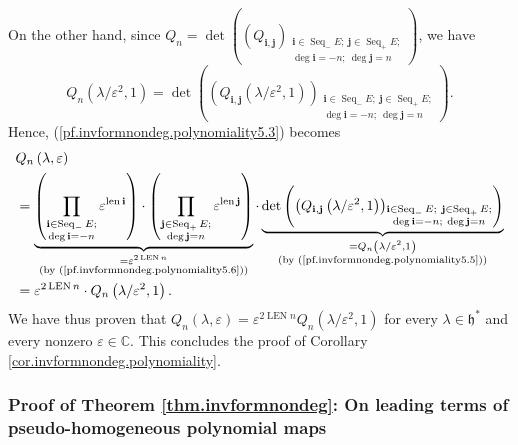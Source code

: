 \documentclass[etingof-lie.tex]{subfiles}
\begin{document}
On the other hand, since $Q_{n}=\det\left(  \left(  Q_{\mathbf{i},\mathbf{j}%
}\right)  _{\substack{\mathbf{i}\in\operatorname*{Seq}\nolimits_{-}%
E;\ \mathbf{j}\in\operatorname*{Seq}\nolimits_{+}E;\\\deg\mathbf{i}%
=-n;\ \deg\mathbf{j}=n}}\right)  $, we have%
\begin{equation}
Q_{n}\left(  \lambda/\varepsilon^{2},1\right)  =\det\left(  \left(
Q_{\mathbf{i},\mathbf{j}}\left(  \lambda/\varepsilon^{2},1\right)  \right)
_{\substack{\mathbf{i}\in\operatorname*{Seq}\nolimits_{-}E;\ \mathbf{j}%
\in\operatorname*{Seq}\nolimits_{+}E;\\\deg\mathbf{i}=-n;\ \deg\mathbf{j}%
=n}}\right)  . \label{pf.invformnondeg.polynomiality5.5}%
\end{equation}
Hence, (\ref{pf.invformnondeg.polynomiality5.3}) becomes%
\begin{align*}
&  Q_{n}\left(  \lambda,\varepsilon\right) \\
&  =\underbrace{\left(  \prod\limits_{\substack{\mathbf{i}\in
\operatorname*{Seq}\nolimits_{-}E;\\\deg\mathbf{i}=-n}}\varepsilon
^{\operatorname*{len}\mathbf{i}}\right)  \cdot\left(  \prod
\limits_{\substack{\mathbf{j}\in\operatorname*{Seq}\nolimits_{+}%
E;\\\deg\mathbf{j}=n}}\varepsilon^{\operatorname*{len}\mathbf{j}}\right)
}_{\substack{=\varepsilon^{2\operatorname*{LEN}n}\\\text{(by
(\ref{pf.invformnondeg.polynomiality5.6}))}}}\cdot\underbrace{\det\left(
\left(  Q_{\mathbf{i},\mathbf{j}}\left(  \lambda/\varepsilon^{2},1\right)
\right)  _{\substack{\mathbf{i}\in\operatorname*{Seq}\nolimits_{-}%
E;\ \mathbf{j}\in\operatorname*{Seq}\nolimits_{+}E;\\\deg\mathbf{i}%
=-n;\ \deg\mathbf{j}=n}}\right)  }_{\substack{=Q_{n}\left(  \lambda
/\varepsilon^{2},1\right)  \\\text{(by
(\ref{pf.invformnondeg.polynomiality5.5}))}}}\\
&  =\varepsilon^{2\operatorname*{LEN}n}\cdot Q_{n}\left(  \lambda
/\varepsilon^{2},1\right)  .
\end{align*}
We have thus proven that $Q_{n}\left(  \lambda,\varepsilon\right)
=\varepsilon^{2\operatorname*{LEN}n}Q_{n}\left(  \lambda/\varepsilon
^{2},1\right)  $ for every $\lambda\in\mathfrak{h}^{\ast}$ and every nonzero
$\varepsilon\in\mathbb{C}$. This concludes the proof of Corollary
\ref{cor.invformnondeg.polynomiality}.

\subsubsection{Proof of Theorem \ref{thm.invformnondeg}: On leading terms of
pseudo-homogeneous polynomial maps}
\end{document}
